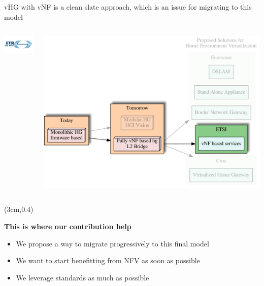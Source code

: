 \documentclass[a4paper]{beamer}
\begin{document}
\begin{frame}{vHG with vNF is a clean slate approach, which is an issue for migrating to this model}
	\begin{columns}[T]
		\begin{column}[T]{0.33 \textwidth} 
			\vspace{6em}
			\includegraphics[width=10em]{etsinfv.png}
		\end{column}
										
		\begin{column}[T]{0.66\textwidth} 
										   
			\includegraphics[width=\textwidth]{vhgtrends-etsi-emphasis.pdf}
																																						
		\end{column}
																										
	\end{columns}
	\begin{textblock*}{8cm}(3cm,0.4\textheight)
		\begin{block}{}
			\textbf{ This is where our contribution help }
			\begin{itemize}
				\item We propose a way to migrate progressively to this final model
				\item We want to start benefitting from NFV as soon as possible
				\item We leverage standards as much as possible
			\end{itemize}
		\end{block}
	\end{textblock*}		
\end{frame}
\end{document}
